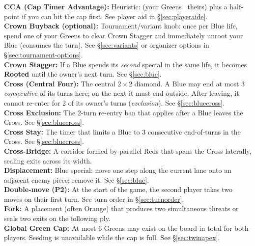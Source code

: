 \documentclass[11pt]{article}
\begin{document}
\textbf{CCA (Cap Timer  Advantage):} Heuristic: (your Greens \minus\ theirs) plus a half-point if you can hit the cap first. See player aid in \S\ref{sec:playeraide}.\\

\textbf{Crown Buyback (optional):} Tournament/variant knob: once per Blue life, spend one of your Greens to clear Crown Stagger and immediately unroot your Blue (consumes the turn). See \S\ref{sec:variants} or organizer options in \S\ref{sec:tournament-options}.\\

\textbf{Crown Stagger:} If a Blue spends its \emph{second} special in the same life, it becomes \textbf{Rooted} until the owner's next turn. See \S\ref{sec:blue}.\\

\textbf{Cross (Central Four):} The central 2\,$\times$\,2 diamond. A Blue may end at most 3 \emph{consecutive} of its turns here; on the next it must end outside. After leaving, it cannot re-enter for 2 of its owner's turns (\emph{exclusion}). See \S\ref{sec:bluecross}.\\

\textbf{Cross Exclusion:} The 2-turn re-entry ban that applies after a Blue leaves the Cross. See \S\ref{sec:bluecross}.\\

\textbf{Cross Stay:} The timer that limits a Blue to 3 consecutive end-of-turns in the Cross. See \S\ref{sec:bluecross}.\\

\textbf{Cross-Bridge:} A corridor formed by parallel Reds that spans the Cross laterally, sealing exits across its width.\\

\textbf{Displacement:} Blue special: move one step along the current lane onto an adjacent enemy piece; remove it. See \S\ref{sec:blue}.\\

\textbf{Double-move (P2):} At the start of the game, the second player takes two moves on their first turn. See turn order in \S\ref{sec:turnorder}.\\

\textbf{Fork:} A placement (often Orange) that produces two simultaneous threats or seals two exits on the following ply.\\

\textbf{Global Green Cap:} At most 6 Greens may exist on the board in total for both players. Seeding is unavailable while the cap is full. See \S\ref{sec:twinapex}.\\
\end{document}
